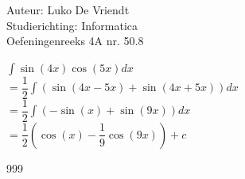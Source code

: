 \documentclass[a4paper]{article}
\begin{document}
\noindent \large Auteur: Luko De Vriendt\\
\noindent \large Studierichting: Informatica\\
\noindent \large Oefeningenreeks 4A nr. 50.8\\

\medskip

\normalsize

$\displaystyle \int \sin (4x) \cos (5x)dx$ \\

$=\dfrac{1}{2}\displaystyle \int \left ( \sin (4x-5x) + \sin (4x+5x) \right )dx$ \\

$=\dfrac{1}{2} \displaystyle \int \left (-\sin (x) + \sin(9x) \right )dx$ \\

$=\dfrac{1}{2} \left ( \cos (x) -\dfrac{1}{9} \cos (9x)\right ) + c$ \\

\begin{thebibliography}{999}
\end{thebibliography}
\end{document}
